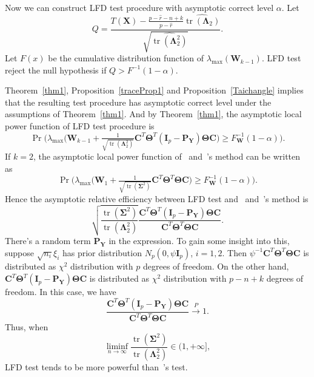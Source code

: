 \documentclass[12pt]{article} %
\DeclareMathOperator{\mytr}{tr}
\newcommand{\bA}{\mathbf{A}}
\newcommand{\bE}{\mathbf{E}}
\newcommand{\bF}{\mathbf{F}}
\newcommand{\bX}{\mathbf{X}}
\newcommand{\bP}{\mathbf{P}}
\newcommand{\bY}{\mathbf{Y}}
\newcommand{\bC}{\mathbf{C}}
\newcommand{\bI}{\mathbf{I}}
\newcommand{\bW}{\mathbf{W}}
\newcommand{\bfsym}[1]{\ensuremath{\boldsymbol{#1}}}
\def\bLambda {\bfsym {\Lambda}}
\def\bSigma {\bfsym {\Sigma}}
\def\bTheta {\bfsym {\Theta}}
\theoremstyle{definition}
\begin{document}
%
Now we can construct LFD test procedure with asymptotic correct level $\alpha$. Let 
$$
Q=\frac{T(\bX)-\frac{p-\hat{r}-n+k}{p-\hat{r}}\widehat{\mytr(\bLambda_2)}}{\sqrt{\widehat{\mytr(\bLambda_2^2)}}}.
$$
Let $F(x)$ be the cumulative distribution function of $\lambda_{\max}(\bW_{k-1})$.
LFD test reject the null hypothesis if $Q> F^{-1}(1-\alpha)$.

Theorem~\ref{thm1}, Proposition~\ref{traceProp1} and Proposition~\ref{Taichangle} implies that the resulting test procedure has asymptotic correct level under the assumptions of Theorem~\ref{thm1}.
And by Theorem~\ref{thm1}, the asymptotic local power function of LFD test procedure is
$$
\Pr\Big(
        \lambda_{\max}\big(\bW_{k-1}+\tfrac{1}{\sqrt{\mytr(\bLambda_2^2)}} \bC^T \bTheta^T (\bI_p-\bP_{\bY})\bTheta \bC\big)\geq F_{\bW}^{-1}(1-\alpha)
\Big).
$$
If $k=2$, the asymptotic local power function of~\cite{Bai1996Efiect} and~\cite{Chen2010A}'s method can be written as
$$
\Pr\Big(
        \lambda_{\max}\big(\bW_{1}+\tfrac{1}{\sqrt{\mytr(\bSigma^2)}} \bC^T \bTheta^T \bTheta \bC\big)\geq F_{\bW}^{-1}(1-\alpha)
\Big).
$$
Hence the asymptotic relative efficiency between LFD test and~\cite{Bai1996Efiect} and~\cite{Chen2010A}'s method is
$$
 \sqrt{\frac{{{\mytr(\bSigma^2)}}}{{\mytr(\bLambda_2^2)}}}
\frac{ \bC^T \bTheta^T (\bI_p-\bP_{\bY})\bTheta \bC}{ {\bC^T \bTheta^T \bTheta \bC}}.
$$
There's a random term $\bP_{\bY}$ in the expression.
To gain some insight into this,
suppose $\sqrt{n_i} \xi_i$ has prior distribution $N_p(0,\psi \bI_p)$, $i=1,2$. Then
$
\psi^{-1}\bC^T \bTheta^T \bTheta \bC$
is distributed as $\chi^2$ distribution with $p$ degrees of freedom.
On the other hand,
$\bC^T \bTheta^T (\bI_p-\bP_{\bY})\bTheta \bC$  is distributed as 
$\chi^2$ distribution with $p-n+k$ degrees of freedom.
In this case, we have
$$
\frac{\bC^T \bTheta^T (\bI_p-\bP_{\bY})\bTheta \bC}{\bC^T \bTheta^T \bTheta \bC}\xrightarrow{P}1.
$$
Thus, when
$$
\liminf_{n\to \infty}\frac{{{\mytr(\bSigma^2)}}}{{\mytr(\bLambda_2^2)}}\in(1,+\infty],
$$
LFD test tends to be more powerful than~\cite{Chen2010A}'s test.
\end{document}

